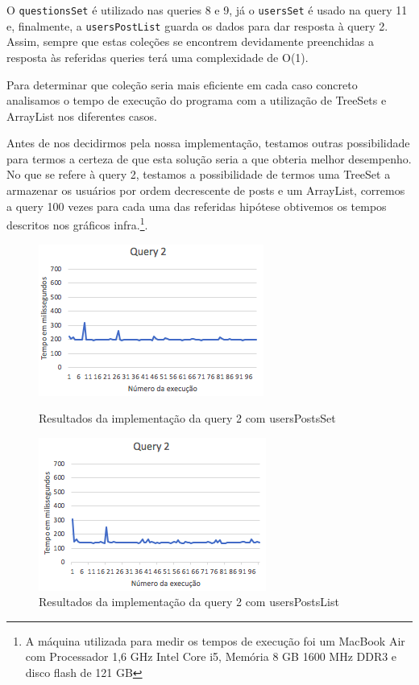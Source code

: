 \documentclass[a4paper]{article}
\begin{document}
O \texttt{questionsSet} é utilizado nas queries 8 e 9, já o \texttt{usersSet} é
usado na query 11 e, finalmente, a \texttt{usersPostList} guarda os dados para dar
resposta à query 2.
Assim, sempre que estas coleções se encontrem devidamente preenchidas
a resposta às referidas queries terá uma complexidade de O(1). \par
Para determinar que coleção seria mais eficiente em cada caso concreto analisamos
o tempo de execução do programa com a utilização de TreeSets e ArrayList nos diferentes
casos. \par
Antes de nos decidirmos pela nossa implementação, testamos outras possibilidade
para termos a certeza de que esta solução seria a que obteria melhor desempenho.
No que se refere à query 2, testamos a possibilidade de termos uma TreeSet a armazenar
os usuários por ordem decrescente de posts e um ArrayList, corremos a query 100 vezes
para cada uma das referidas hipótese obtivemos os tempos descritos nos gráficos
infra.\footnote{A máquina utilizada para medir os tempos de execução foi um
MacBook Air com Processador 1,6 GHz Intel Core i5, Memória 8 GB 1600 MHz DDR3 e
disco flash de 121 GB}.

\begin{figure}[H]
    \centering
    \begin{minipage}[b]{0.4\textwidth}
    \includegraphics[scale=0.7]{Query2_Set}
    \caption{Resultados da implementação da query 2 com usersPostsSet}
    \label{figRotulo}
  \end{minipage}
 \hfill
   \begin{minipage}[b]{0.5\textwidth}
      \includegraphics[scale=0.7]{Query2_List}
      \caption{Resultados da implementação da query 2 com usersPostsList}
      \label{figRotulo}
      \end{minipage}
    \end{figure}
\end{document}
